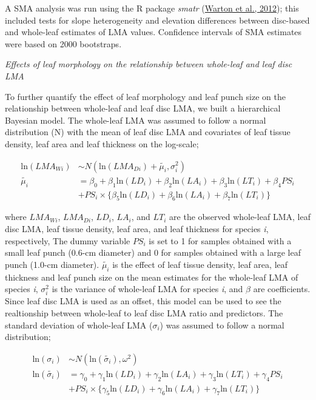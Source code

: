 \documentclass[
  12pt,
  a4paper,
,tablecaptionabove
]{scrartcl}
\begin{document}
A SMA analysis was run using the R package \emph{smatr} (\protect\hyperlink{ref-Warton2012a}{Warton et al., 2012}); this included tests for slope heterogeneity and elevation differences between disc-based and whole-leaf estimates of LMA values.
Confidence intervals of SMA estimates were based on 2000 bootstraps.

\emph{Effects of leaf morphology on the relationship between whole-leaf and leaf disc LMA}

To further quantify the effect of leaf morphology and leaf punch size on the relationship between whole-leaf and leaf disc LMA, we built a hierarchical Bayesian model.
The whole-leaf LMA was assumed to follow a normal distribution (N) with the mean of leaf disc LMA and covariates of leaf tissue density, leaf area and leaf thickness on the log-scale;

\begin{align}
\mathrm{ln}(LMA_{Wi}) & \sim N(\mathrm{ln}(LMA_{Di}) + \tilde{\mu_i}, \sigma_i^2) \label{eq:LMA}\\
\tilde{\mu_i} & = \beta_0 + \beta_1 \mathrm{ln}(LD_{i}) + \beta_2 \mathrm{ln}(LA_{i}) + \beta_3 \mathrm{ln}(LT_{i}) + \beta_4 PS_{i} \nonumber \\
& + PS_{i} \times \bigl\{ \beta_5 \mathrm{ln}(LD_{i}) + \beta_6 \mathrm{ln}(LA_{i}) + \beta_7 \mathrm{ln}(LT_{i})\bigr\}\label{eq:mu}
\end{align}

where \(LMA_{Wi}\), \(LMA_{Di}\), \(LD_{i}\), \(LA_{i}\), and \(LT_{i}\) are the observed whole-leaf LMA, leaf disc LMA, leaf tissue density, leaf area, and leaf thickness for species \emph{i}, respectively,
The dummy variable \(PS_i\) is set to 1 for samples obtained with a small leaf punch (0.6-cm diameter) and 0 for samples obtained with a large leaf punch (1.0-cm diameter).
\(\tilde{\mu_i}\) is the effect of leaf tissue density, leaf area, leaf thickness and leaf punch size on the mean estimates for the whole-leaf LMA of species \emph{i}, \(\sigma_i^2\) is the variance of whole-leaf LMA for species \emph{i}, and \(\beta\) are coefficients.
Since leaf disc LMA is used as an offset, this model can be used to see the realtionship between whole-leaf to leaf disc LMA ratio and predictors.
The standard deviation of whole-leaf LMA (\(\sigma_i\)) was assumed to follow a normal distribution;

\begin{align}
\mathrm{ln}(\sigma_i) & \sim N(\mathrm{ln}(\tilde{\sigma_i}), \omega^2) \label{eq:ln-sigma} \\
\mathrm{ln}(\tilde{\sigma_i}) & = \gamma_0 + \gamma_1 \mathrm{ln}(LD_{i}) + \gamma_2 \mathrm{ln}(LA_{i}) + \gamma_3 \mathrm{ln}(LT_{i}) + \gamma_4 PS_{i} \nonumber \\
& + PS_{i} \times \bigl\{\gamma_5 \mathrm{ln}(LD_{i}) + \gamma_6 \mathrm{ln}(LA_{i}) + \gamma_7 \mathrm{ln}(LT_{i})\bigr\}\label{eq:tilde-sigma}
\end{align}
\end{document}
